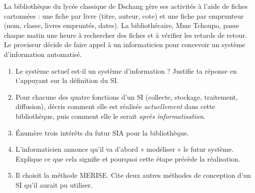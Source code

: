 \documentclass[11pt]{article}
\begin{document}
\begin{exercice}
La bibliothèque du lycée classique de Dschang gère ses activités à l'aide de fiches cartonnées : une fiche par livre (titre, auteur, cote) et une fiche par emprunteur (nom, classe, livres empruntés, dates). La bibliothécaire, Mme Tchoupo, passe chaque matin une heure à rechercher des fiches et à vérifier les retards de retour. Le proviseur décide de faire appel à un informaticien pour concevoir un système d'information automatisé.
\begin{enumerate}
\item Le système actuel est-il un système d'information ? Justifie ta réponse en t'appuyant sur la définition du SI.
\item Pour chacune des quatre fonctions d'un SI (collecte, stockage, traitement, diffusion), décris comment elle est réalisée \emph{actuellement} dans cette bibliothèque, puis comment elle le serait \emph{après informatisation}.
\item Énumère trois intérêts du futur SIA pour la bibliothèque.
\item L'informaticien annonce qu'il va d'abord « modéliser » le futur système. Explique ce que cela signifie et pourquoi cette étape précède la réalisation.
\item Il choisit la méthode MERISE. Cite deux autres méthodes de conception d'un SI qu'il aurait pu utiliser.
\end{enumerate}
\end{exercice}
\end{document}
